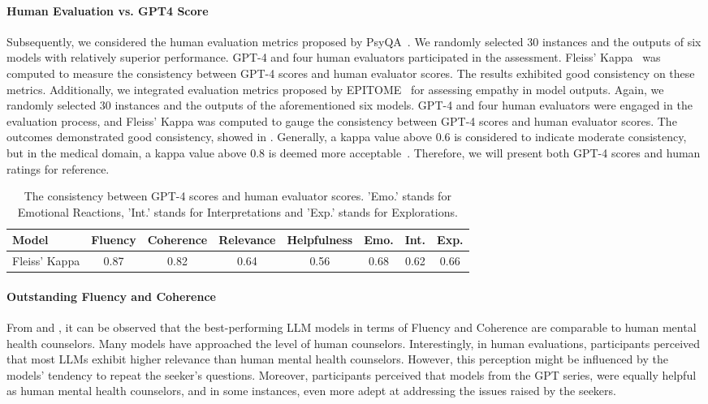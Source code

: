 \paragraph{Human Evaluation vs. GPT4 Score} Subsequently, we considered the human evaluation metrics proposed by PsyQA~\citep{sun-etal-2021-psyqa}. We randomly selected 30 instances and the outputs of six models with relatively superior performance. GPT-4 and four human evaluators participated in the assessment. Fleiss' Kappa~\citep{fleiss1971measuring} was computed to measure the consistency between GPT-4 scores and human evaluator scores. The results exhibited good consistency on these metrics. Additionally, we integrated evaluation metrics proposed by EPITOME~\citep{sharma-etal-2020-computational} for assessing empathy in model outputs. Again, we randomly selected 30 instances and the outputs of the aforementioned six models. GPT-4 and four human evaluators were engaged in the evaluation process, and Fleiss' Kappa was computed to gauge the consistency between GPT-4 scores and human evaluator scores. The outcomes demonstrated good consistency, showed in . Generally, a kappa value above 0.6 is considered to indicate moderate consistency, but in the medical domain, a kappa value above 0.8 is deemed more acceptable~\citep{mchugh2012interrater}. Therefore, we will present both GPT-4 scores and human ratings for reference.

\begin{table}[htbp]
\centering
\footnotesize
\begin{tabular}{l c c c c c c c}
\hline
\textbf{Model} & \textbf{Fluency} & \textbf{Coherence} & \textbf{Relevance} & \textbf{Helpfulness} & \textbf{Emo.} & \textbf{Int.} & \textbf{Exp.}\\
\hline
Fleiss' Kappa & 0.87 & 0.82 & 0.64 & 0.56 & 0.68 & 0.62 & 0.66\\
\hline
\end{tabular}
\caption{The consistency between GPT-4 scores and human evaluator scores. 'Emo.' stands for Emotional Reactions, 'Int.' stands for Interpretations and 'Exp.' stands for Explorations.}
\label{tab: consistency}
\end{table}

\paragraph{Outstanding Fluency and Coherence} From  and , it can be observed that the best-performing LLM models in terms of Fluency and Coherence are comparable to human mental health counselors. Many models have approached the level of human counselors. Interestingly, in human evaluations, participants perceived that most LLMs exhibit higher relevance than human mental health counselors. However, this perception might be influenced by the models' tendency to repeat the seeker's questions. Moreover, participants perceived that models from the GPT series, were equally helpful as human mental health counselors, and in some instances, even more adept at addressing the issues raised by the seekers.

